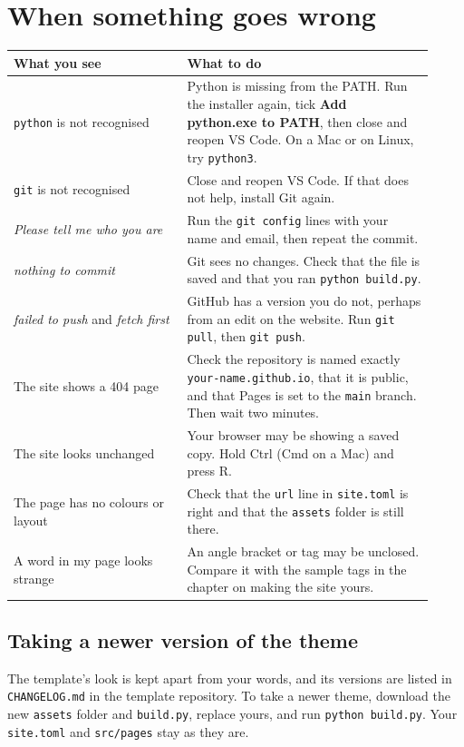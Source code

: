 \chapter{When something goes wrong}
\label{ch:problems}

\begin{longtable}{p{0.38\linewidth}p{0.54\linewidth}}
\toprule
What you see & What to do \\
\midrule
\texttt{python} is not recognised & Python is missing from the PATH. Run the installer again, tick \textbf{Add python.exe to PATH}, then close and reopen VS Code. On a Mac or on Linux, try \texttt{python3}. \\
\texttt{git} is not recognised & Close and reopen VS Code. If that does not help, install Git again. \\
\emph{Please tell me who you are} & Run the \texttt{git config} lines with your name and email, then repeat the commit. \\
\emph{nothing to commit} & Git sees no changes. Check that the file is saved and that you ran \texttt{python build.py}. \\
\emph{failed to push} and \emph{fetch first} & GitHub has a version you do not, perhaps from an edit on the website. Run \texttt{git pull}, then \texttt{git push}. \\
The site shows a 404 page & Check the repository is named exactly \texttt{your-name.github.io}, that it is public, and that Pages is set to the \texttt{main} branch. Then wait two minutes. \\
The site looks unchanged & Your browser may be showing a saved copy. Hold Ctrl (Cmd on a Mac) and press R. \\
The page has no colours or layout & Check that the \texttt{url} line in \texttt{site.toml} is right and that the \texttt{assets} folder is still there. \\
A word in my page looks strange & An angle bracket or tag may be unclosed. Compare it with the sample tags in the chapter on making the site yours. \\
\bottomrule
\end{longtable}

\section{Taking a newer version of the theme}

The template's look is kept apart from your words, and its versions are listed in \texttt{CHANGELOG.md} in the template repository. To take a newer theme, download the new \texttt{assets} folder and \texttt{build.py}, replace yours, and run \texttt{python build.py}. Your \texttt{site.toml} and \texttt{src/pages} stay as they are.
